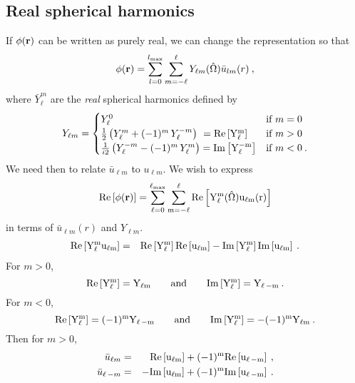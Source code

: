 \subsection{Real spherical harmonics}
\renewcommand{\Re}{\rm Re}
\renewcommand{\Im}{\rm Im}
If $\phi(\mathbf{r})$ can be written as purely real, we can change the
representation so that
\begin{equation}
\phi(\mathbf{r}) = \sum_{l=0}^{l_\text{max}} \sum_{m=-\ell}^\ell Y_{\ell m}(\hat{\Omega})
\bar{u}_{lm}(r)\:,
\end{equation}
where $\bar{Y}_\ell^m$ are the {\em real} spherical harmonics defined by
\begin{equation}
Y_{\ell m} = \begin{cases}
Y_\ell^0 & \mbox{if } m=0\\
{1\over 2}\left(Y_\ell^m+(-1)^m \, Y_\ell^{-m}\right) \ = \Re\left[Y_\ell^m\right]
& \mbox{if } m>0 \\
{1\over i 2}\left(Y_\ell^{-m}-(-1)^{m}\, Y_\ell^{m}\right) = \Im\left[Y_\ell^{-m}\right]
&\mbox{if } m<0\:.
\end{cases}
\end{equation}
We need then to relate $\bar{u}_{\ell m}$ to $u_{\ell m}$.  We wish
to express
\begin{equation}
\Re\left[\phi(\vr)\right] = \sum_{\ell=0}^{\ell_\text{max}} \sum_{m=-\ell}^\ell
\Re\left[Y_\ell^m (\hat{\Omega}) u_{\ell m}(r)\right]
\end{equation}
in terms of $\bar{u}_{\ell m}(r)$ and $Y_{\ell m}$.
\begin{eqnarray}
\Re\left[Y_\ell^m u_{\ell m}\right] & = & \Re\left[Y_\ell^m\right]
\Re\left[u_{\ell m}\right] - \Im\left[Y_\ell^m\right] \Im\left[u_{\ell m}\right]\:.
\end{eqnarray}
For $m>0$,
\begin{equation}
\Re\left[Y_\ell^m\right] = Y_{\ell m} \qquad \text{and} \qquad \Im\left[Y_\ell^m\right] = Y_{\ell\,-m}\:.
\end{equation}
For $m<0$,
\begin{equation}
\Re\left[Y_\ell^m\right] = (-1)^m Y_{\ell\, -m} \qquad \text and \qquad \Im\left[Y_\ell^m\right] = -(-1)^m Y_{\ell m}\:.
\end{equation}
Then for $m > 0$,
\begin{eqnarray}
\bar{u}_{\ell m} & = & \Re\left[u_{\ell m}\right] + (-1)^m \Re\left[u_{\ell\,-m}\right]\:, \\
\bar{u}_{\ell\, -m} & = & -\Im\left[u_{\ell m}\right] + (-1)^m \Im\left[u_{\ell\,-m}\right]\:.
\end{eqnarray}



